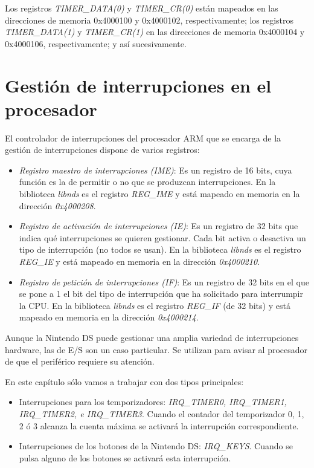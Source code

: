 Los registros \textit{TIMER\_DATA(0)} y \textit{TIMER\_CR(0)} están mapeados en las direcciones de memoria 0x4000100 y 0x4000102, respectivamente; los registros   \textit{TIMER\_DATA(1)} y \textit{TIMER\_CR(1)} en las direcciones de memoria 0x4000104 y 0x4000106, respectivamente; y así sucesivamente. 

\section{Gestión de interrupciones en el procesador}
El controlador de interrupciones del procesador ARM que se encarga de la gestión de interrupciones dispone de varios registros: 

\begin{itemize}
	\item \textit{Registro maestro de interrupciones (IME)}: Es un registro de 16 bits, cuya función es la de permitir o no que se produzcan interrupciones. En la biblioteca \textit{libnds} es el registro \textit{REG\_IME} y está mapeado en memoria en la dirección \textit{0x4000208}.
	\item \textit{Registro de activación de interrupciones (IE)}: Es un registro de 32 bits que indica qué interrupciones se quieren gestionar. Cada bit activa o desactiva un tipo de interrupción (no todos se usan). En la biblioteca \textit{libnds} es el registro \textit{REG\_IE} y está mapeado en memoria en la dirección \textit{0x4000210}.  
	\item  \textit{Registro de petición de interrupciones (IF)}: Es un registro de 32 bits en el que se pone a 1 el bit del tipo de interrupción que ha solicitado para interrumpir la CPU. En la biblioteca \textit{libnds} es el registro \textit{REG\_IF} (de 32 bits) y está mapeado en memoria en la dirección \textit{0x4000214}. 
\end{itemize}

Aunque la Nintendo DS puede gestionar  una amplia variedad de interrupciones hardware, las de E/S son un caso particular. Se utilizan para avisar al procesador de que el periférico  requiere su atención. 

En este capítulo sólo vamos a trabajar con dos tipos principales:
%
\begin{itemize}
	\item Interrupciones para los temporizadores: \textit{IRQ\_TIMER0, IRQ\_TIMER1, IRQ\_TIMER2, e  IRQ\_TIMER3}. Cuando el contador del temporizador 0, 1, 2 ó 3  alcanza la cuenta máxima se activará la interrupción correspondiente.
	\item Interrupciones de los botones de la Nintendo DS: \textit{IRQ\_KEYS}. Cuando se pulsa alguno de los botones se activará esta interrupción.
\end{itemize}

